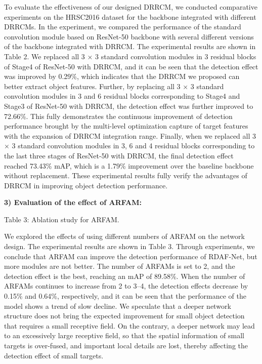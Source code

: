 \documentclass[10pt,twocolumn,final]{article}
\begin{document}
To evaluate the effectiveness of our designed DRRCM, we conducted comparative experiments on the HRSC2016 dataset for the backbone integrated with different DRRCMs. In the experiment, we compared the performance of the standard convolution module based on ResNet-50 backbone with several different versions of the backbone integrated with DRRCM. The experimental results are shown in Table 2. We replaced all 3 × 3 standard convolution modules in 3 residual blocks of Stage4 of ResNet-50 with DRRCM, and it can be seen that the detection effect was improved by 0.29\%, which indicates that the DRRCM we proposed can better extract object features. Further, by replacing all 3 × 3 standard convolution modules in 3 and 6 residual blocks corresponding to Stage4 and Stage3 of ResNet-50 with DRRCM, the detection effect was further improved to 72.66\%. This fully demonstrates the continuous improvement of detection performance brought by the multi-level optimization capture of target features with the expansion of DRRCM integration range. Finally, when we replaced all 3 × 3 standard convolution modules in 3, 6 and 4 residual blocks corresponding to the last three stages of ResNet-50 with DRRCM, the final detection effect reached 73.43\% mAP, which is a 1.79\% improvement over the baseline backbone without replacement. These experimental results fully verify the advantages of DRRCM in improving object detection performance.

\textbf{3) Evaluation of the effect of ARFAM:}

Table 3: Ablation study for ARFAM.

We explored the effects of using different numbers of ARFAM on the network design. The experimental results are shown in Table 3. Through experiments, we conclude that ARFAM can improve the detection performance of RDAF-Net, but more modules are not better. The number of ARFAMs is set to 2, and the detection effect is the best, reaching an mAP of 89.58\%. When the number of ARFAMs continues to increase from 2 to 3–4, the detection effects decrease by 0.15\% and 0.64\%, respectively, and it can be seen that the performance of the model shows a trend of slow decline. We speculate that a deeper network structure does not bring the expected improvement for small object detection that requires a small receptive field. On the contrary, a deeper network may lead to an excessively large receptive field, so that the spatial information of small targets is over-fused, and important local details are lost, thereby affecting the detection effect of small targets.
\end{document}
